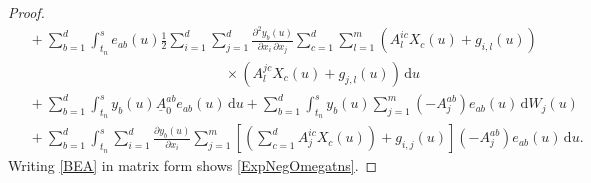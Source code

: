 \documentclass[10pt,a4paper]{amsart}
\begin{document}
\begin{proof}
\begin{align}
&\;+\sum_{b=1}^d\int_{t_n}^se_{ab}(u)\frac{1}{2}\sum_{i=1}^d\sum_{j=1}^d\frac{\partial^2y_b(u)}{\partial x_i\,\partial x_j}\sum_{c=1}^d\sum_{l=1}^m\left(A_l^{ic}X_c(u)+g_{i,l}(u)\right)\nonumber\\
&\hspace{6cm}\times\left(A_l^{jc}X_c(u)+g_{j,l}(u)\right)\,\mathrm{d}u\nonumber\\
&\;+\sum_{b=1}^d\int_{t_n}^sy_b(u)\underline{A}_0^{ab}e_{ab}(u)\,\mathrm{d}u+\sum_{b=1}^d\int_{t_n}^sy_b(u)\sum_{j=1}^m(-A_j^{ab})e_{ab}(u)\,\mathrm{d}W_j(u)\nonumber\\
&\;+\sum_{b=1}^d\int_{t_n}^s\!\sum_{i=1}^d\frac{\partial y_b(u)}{\partial x_i}\!\sum_{j=1}^m\left[\left(\!\sum_{c=1}^dA_j^{ic}X_c(u)\!\right)+g_{i,j}(u)\right]\!\left(-A_j^{ab}\right)e_{ab}(u)\,\mathrm{d}u.\nonumber
\end{align}
Writing \cref{BEA} in matrix form shows \cref{ExpNegOmegatns}.
\end{proof}
\end{document}
